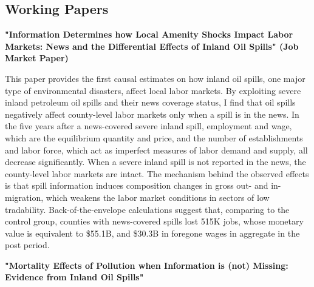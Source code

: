 \documentclass[letterpaper]{article}
\renewenvironment{itemize}{
  \begin{list}{}{
    \setlength{\leftmargin}{0.35em}
  }
}{
  \end{list}
}
\begin{document}
\subsection*{Working Papers}
\begin{itemize}
\item \textbf{"Information Determines how Local Amenity Shocks Impact Labor Markets: News and the Differential Effects of Inland Oil Spills" (Job Market Paper)}




This paper provides the first causal estimates on how inland oil spills, one major type of environmental disasters, affect local labor markets. By exploiting severe inland petroleum oil spills and their news coverage status, I find that oil spills negatively affect county-level labor markets only when a spill is in the news. In the five years after a news-covered severe inland spill, employment and wage, which are the equilibrium quantity and price, and the number of establishments and labor force, which act as imperfect measures of labor demand and supply, all decrease significantly. When a severe inland spill is not reported in the news, the county-level labor markets are intact. The mechanism behind the observed effects is that spill information induces composition changes in gross out- and in-migration, which weakens the labor market conditions in sectors of low tradability. Back-of-the-envelope calculations suggest that, comparing to the control group, counties with news-covered spills lost 515K jobs, whose monetary value is equivalent to \$55.1B, and \$30.3B in foregone wages in aggregate in the post period.


\item \textbf{"Mortality Effects of Pollution when Information is (not) Missing: Evidence from Inland Oil Spills"}



\end{itemize}
\end{document}
